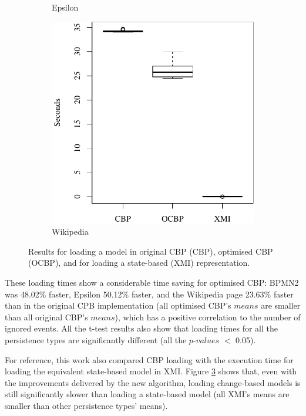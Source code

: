 {\begin{figure}[ht]
\begin{subfigure}{0.325\textwidth}
    \caption{Epsilon}
    \label{fig:load_time_epsilon}
  \end{subfigure}
  \hfill
  \begin{subfigure}{0.325\textwidth}
    \centering
    \includegraphics[width=\linewidth]{images/ol_load_time_wikipedia}
    \caption{Wikipedia}
    \label{fig:load_time_wikipedia}
  \end{subfigure}
  \caption{Results for loading a model in original CBP (CBP), optimised CBP (OCBP), and for loading a state-based (XMI) representation.}
  \label{fig:loadtime}
\end{figure}

These loading times show a considerable time saving for optimised CBP: BPMN2 was 48.02\% faster, Epsilon 50.12\% faster, and the Wikipedia page 23.63\% faster than in the original CPB implementation (all optimised CBP's $means$ are  smaller than all original CBP's $means$), which has a positive correlation to the number of ignored events. All the t-test results also show that loading times for all the persistence types are significantly different (all the $p$-$values$ $<$ 0.05). 

For reference, this work also compared CBP loading with the execution time for loading the equivalent state-based model in XMI. Figure \ref{fig:loadtime} shows that, even with the improvements delivered by the new algorithm, loading change-based models is still significantly slower than loading a state-based model (all XMI's means are smaller than other persistence types' means).

}
